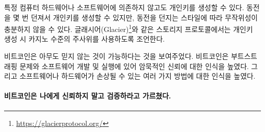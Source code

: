 \begin{comment}
Note that you can generate a private key without relying on any computational
hardware or software. You can flip a coin~\cite{antonopoulos2014mastering} a
couple of times, although depending on your coin and tossing style this source
of randomness might not be sufficiently random. There is a reason why storage
protocols like Glacier\footnote{\url{https://glacierprotocol.org/}} advise to
use casino-grade dice as one of two sources of entropy.
\end{comment}
특정 컴퓨터 하드웨어나 소프트웨어에 의존하지 않고도 개인키를 생성할 수 있다.
동전을 몇 번 던져서 개인키를 생성할 수 있지만\cite{antonopoulos2014mastering},
동전을 던지는 스타일에 따라 무작위성이 충분하지 않을 수 있다.
글래시어(Glacier)\footnote{\url{https://glacierprotocol.org/}}와 같은 스토리지 프로토콜에서는 
개인키 생성 시 카지노 수준의 주사위를 사용하도록 조언한다.

\begin{comment}
Bitcoin forced me to reflect on what trusting nobody actually entails.
It raised my awareness of the bootstrapping problem, and the implicit
chain-of-trust in developing and running software. It also raised my
awareness of the many ways in which software and hardware can be
compromised고고
\end{comment}
비트코인은 아무도 믿지 않는 것이 가능하다는 것을 보여주었다.
비트코인은 부트스트래핑 문제와 소프트웨어 개발 및 실행에 있어 암묵적인 신뢰에 대한 인식을 높였다.
그리고 소프트웨어나 하드웨어가 손상될 수 있는 여러 가지 방법에 대한 인식을 높였다.

\paragraph{비트코인은 나에게 신뢰하지 말고 검증하라고 가르쳤다.}

